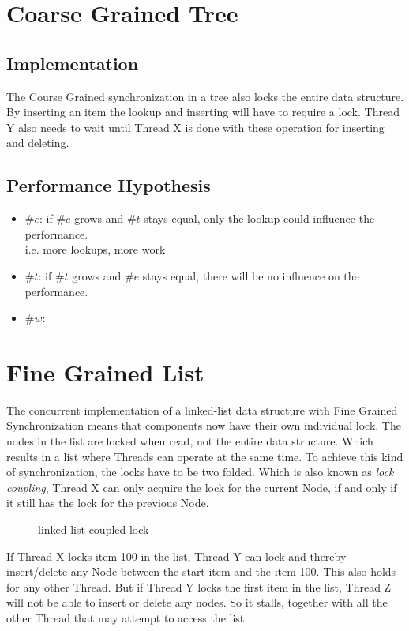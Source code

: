 \documentclass[10pt,a4paper]{article}
\begin{document}
\section{Coarse Grained Tree}
\subsection{Implementation}
The Course Grained synchronization in a tree also locks the entire
data structure. By inserting an item the lookup and inserting will have to
require a lock. Thread Y also needs to wait until
Thread X is done with these operation for inserting and deleting.

\subsection{Performance Hypothesis}
\begin{itemize}
 \item $\#e$:   if $\#e$ grows and $\#t$ stays equal, only the lookup could influence the
 performance. \\ i.e. more lookups, more work
 \item $\#t$:   if $\#t$ grows and $\#e$ stays equal, there will be no influence on the performance.
 \item $\#w$:   
\end{itemize}

\section{Fine Grained List}
The concurrent implementation of a linked-list data structure with Fine Grained
Synchronization means that components now have their own individual lock. The
nodes in the list are locked when read, not the entire data structure. Which
results in a list where Threads can operate at the same time. To achieve this
kind of synchronization, the locks have to be two folded. Which is also known 
as \emph{lock coupling}, Thread X can only acquire the lock for the current 
Node, if and only if it still has the lock for the previous Node.
\begin{figure}[h]
\centerline{
}
\caption{linked-list coupled lock}
\end{figure}
If Thread X locks item 100 in the list, Thread Y can lock and thereby
insert/delete any Node between the start item and the item 100. This
also holds for any other Thread. But if Thread Y locks the first item in the
list, Thread Z will not be able to insert or delete any nodes. So it stalls,
together with all the other Thread that may attempt to access the list.
\end{document}
